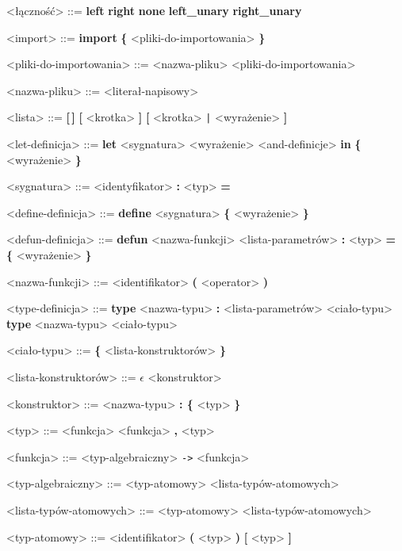 \documentclass[12pt]{article}
\begin{document}
\begin{grammar}
<łączność> ::=
    \textbf{left}
    \alt \textbf{right}
    \alt \textbf{none}
    \alt \textbf{left_unary}
    \alt \textbf{right_unary}

<import> ::=
    \textbf{import} \textbf{\{} <pliki-do-importowania> \textbf{\}}

<pliki-do-importowania> ::=
    <nazwa-pliku>
     <pliki-do-importowania>

<nazwa-pliku> ::=
    <literał-napisowy>

<lista> ::=
    \textbf{[\,]}
    \alt \textbf{[} <krotka> \textbf{]}
    \alt \textbf{[} <krotka> \texttt{|} <wyrażenie> \textbf{]}

<let-definicja> ::=
    \textbf{let} <sygnatura> <wyrażenie> <and-definicje>
    \textbf{in} \textbf{\{} <wyrażenie> \textbf{\}} 

<sygnatura> ::=
    <identyfikator> \textbf{:} <typ> \textbf{=}

<define-definicja> ::=
    \textbf{define} <sygnatura> \textbf{\{} <wyrażenie> \textbf{\}}

<defun-definicja> ::=
    \textbf{defun} <nazwa-funkcji> <lista-parametrów> \textbf{:} <typ> 
    \textbf{= \{} <wyrażenie> \textbf{\}}

<nazwa-funkcji> ::=
    <identifikator>
    \alt \textbf{(} <operator> \textbf{)}

<type-definicja> ::=
    \textbf{type} <nazwa-typu> 
    \textbf{:} <lista-parametrów> <ciało-typu>
    \alt \textbf{type} <nazwa-typu> <ciało-typu>

<ciało-typu> ::= 
    \textbf{\{} <lista-konstruktorów> \textbf{\}}

<lista-konstruktorów> ::=
    $\epsilon$
     <konstruktor>

<konstruktor> ::=
    <nazwa-typu>
     \textbf{: \{} <typ> \textbf{\}}
    
<typ> ::=
    <funkcja>
    \alt <funkcja> \textbf{,} <typ>

<funkcja> ::= 
    <typ-algebraiczny>
     \texttt{->} <funkcja>

<typ-algebraiczny> ::=
    <typ-atomowy>
     <lista-typów-atomowych>

<lista-typów-atomowych> ::=
    <typ-atomowy>
     <lista-typów-atomowych>

<typ-atomowy> ::=
    <identifikator>
    \alt \textbf{(} <typ> \textbf{)}
    \alt \textbf{[} <typ> \textbf{]}


\end{grammar}
\end{document}
